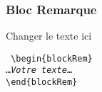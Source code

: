 \documentclass[t,aspectratio=169]{beamer}
\begin{document}
\begin{frame}
\frametitle{Bloc \og Remarque\fg}
\begin{blockRem}
Changer le texte ici
\end{blockRem}
\noindent\texttt{%
\textbackslash begin\{blockRem\}\\
\ldots\emph{Votre texte}\ldots\\
\textbackslash end\{blockRem\}}%
\end{frame}
\end{document}
